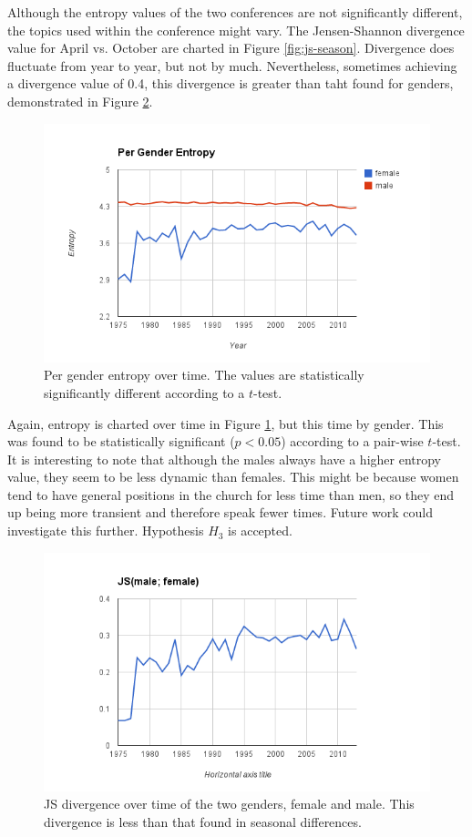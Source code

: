 Although the entropy values of the two conferences are not significantly different, the topics used within the conference might vary. The Jensen-Shannon divergence value for April vs. October are charted in Figure \ref{fig:js-season}. Divergence does fluctuate from year to year, but not by much. Nevertheless, sometimes achieving a divergence value of 0.4, this divergence is greater than taht found for genders, demonstrated in Figure \ref{fig:js-gender}.

\begin{figure}[center]
	\centering
	\includegraphics[width=12cm]{images/H(per-gender).png}
	\caption{Per gender entropy over time. The values are statistically significantly different according to a $t$-test.}
	\label{fig:entropy-per-gender}
\end{figure}

Again, entropy is charted over time in Figure \ref{fig:entropy-per-gender}, but this time by gender. This was found to be statistically significant ($p < 0.05$) according to a pair-wise $t$-test. It is interesting to note that although the males always have a higher entropy value, they seem to be less dynamic than females. This might be because women tend to have general positions in the church for less time than men, so they end up being more transient and therefore speak fewer times. Future work could investigate this further. Hypothesis $H_3$ is accepted.

\begin{figure}[center]
	\centering
	\includegraphics[width=12cm]{images/JS(female;male).png}
	\caption{JS divergence over time of the two genders, female and male. This divergence is less than that found in seasonal differences.}
	\label{fig:js-gender}
\end{figure}

